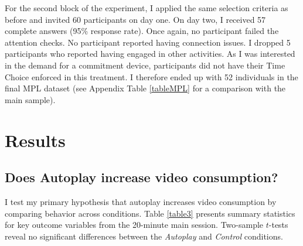 \documentclass[11pt,a4paper,oneside]{article}
\begin{document}
For the second block of the experiment, I applied the same selection criteria as before and invited 60 participants on day one. On day two, I received 57 complete answers (95\% response rate). Once again, no participant failed the attention checks. No participant reported having connection issues. I dropped 5 participants who reported having engaged in other activities. As I was interested in the demand for a commitment device, participants did not have their Time Choice enforced in this treatment. I therefore ended up with 52 individuals in the final MPL dataset (see Appendix Table \ref{tableMPL} for a comparison with the main sample).

\section{Results}\label{Results}
\subsection{Does Autoplay increase video consumption?}
I test my primary hypothesis that autoplay increases video consumption by comparing behavior across conditions. Table \ref{table3} presents summary statistics for key outcome variables from the 20-minute main session. Two-sample $t$-tests reveal no significant differences between the \textit{Autoplay} and \textit{Control} conditions.
\end{document}
